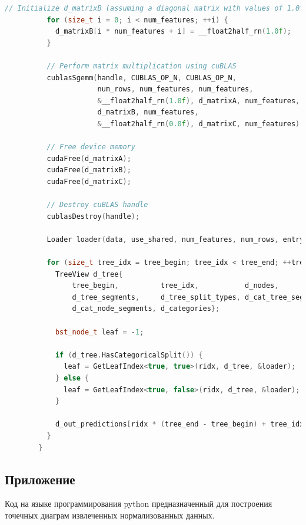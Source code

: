 \documentclass[14pt, a4paper]{extreport}
\begin{document}
\begin{lstlisting}[language=C++, label={lst:xgboost_tensor_kernel_calculation}]
          // Initialize d_matrixB (assuming a diagonal matrix with values of 1.0f)
          for (size_t i = 0; i < num_features; ++i) {
            d_matrixB[i * num_features + i] = __float2half_rn(1.0f);
          }

          // Perform matrix multiplication using cuBLAS
          cublasSgemm(handle, CUBLAS_OP_N, CUBLAS_OP_N,
                      num_rows, num_features, num_features,
                      &__float2half_rn(1.0f), d_matrixA, num_features,
                      d_matrixB, num_features,
                      &__float2half_rn(0.0f), d_matrixC, num_features);

          // Free device memory
          cudaFree(d_matrixA);
          cudaFree(d_matrixB);
          cudaFree(d_matrixC);

          // Destroy cuBLAS handle
          cublasDestroy(handle);

          Loader loader(data, use_shared, num_features, num_rows, entry_start, missing);

          for (size_t tree_idx = tree_begin; tree_idx < tree_end; ++tree_idx) {
            TreeView d_tree{
                tree_begin,          tree_idx,           d_nodes,
                d_tree_segments,     d_tree_split_types, d_cat_tree_segments,
                d_cat_node_segments, d_categories};

            bst_node_t leaf = -1;

            if (d_tree.HasCategoricalSplit()) {
              leaf = GetLeafIndex<true, true>(ridx, d_tree, &loader);
            } else {
              leaf = GetLeafIndex<true, false>(ridx, d_tree, &loader);
            }

            d_out_predictions[ridx * (tree_end - tree_begin) + tree_idx] = __float2half_rn(leaf);
          }
        }
    \end{lstlisting}

    \subsection{Приложение } \label{subsec:dot_diagram_code}
    Код на языке программирования python предназначенный для построения точечных диаграм извлеченных нормализованных данных.
\end{document}
